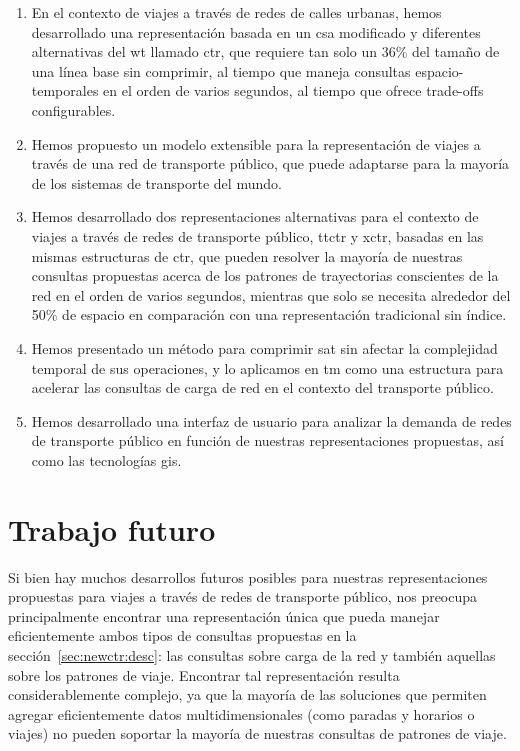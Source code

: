     \begin{enumerate}
        \item En el contexto de viajes a trav\'es de redes de calles urbanas, hemos desarrollado una representaci\'on basada en un \gls{csa} modificado y diferentes alternativas del \gls{wt} llamado \gls{ctr}, que requiere tan solo un 36\% del tama\~no de una l\'inea base sin comprimir, al tiempo que maneja consultas espacio-temporales en el orden de varios \micro segundos, al tiempo que ofrece trade-offs configurables.
        
        \item Hemos propuesto un modelo extensible para la representaci\'on de viajes a trav\'es de una red de transporte p\'ublico, que puede adaptarse para la mayor\'ia de los sistemas de transporte del mundo.
        
        \item Hemos desarrollado dos representaciones alternativas para el contexto de viajes a trav\'es de redes de transporte p\'ublico, \gls{ttctr} y \gls{xctr}, basadas en las mismas estructuras de \gls{ctr}, que pueden resolver la mayor\'ia de nuestras consultas propuestas acerca de los patrones de trayectorias conscientes de la red en el orden de varios \micro segundos, mientras que solo se necesita alrededor del 50\% de espacio en comparaci\'on con una representaci\'on tradicional sin \'indice.
        
        \item Hemos presentado un m\'etodo para comprimir \gls{sat} sin afectar la complejidad temporal de sus operaciones, y lo aplicamos en \gls{tm} como una estructura para acelerar las consultas de carga de red en el contexto del transporte p\'ublico.
        
        \item Hemos desarrollado una interfaz de usuario para analizar la demanda de redes de transporte p\'ublico en funci\'on de nuestras representaciones propuestas, as\'i como las tecnolog\'ias \gls{gis}.
    \end{enumerate}


\section{Trabajo futuro}
\label{sec:appendix-spanishsummary:trabajo-futuro}
    Si bien hay muchos desarrollos futuros posibles para nuestras representaciones propuestas para viajes a trav\'es de redes de transporte p\'ublico, nos preocupa principalmente encontrar una representaci\'on \'unica que pueda manejar eficientemente ambos tipos de consultas propuestas en la secci\'on~\ref{sec:newctr:desc}: las consultas sobre carga de la red y tambi\'en aquellas sobre los patrones de viaje. Encontrar tal representaci\'on resulta considerablemente complejo, ya que la mayor\'ia de las soluciones que permiten agregar eficientemente datos multidimensionales (como paradas y horarios o viajes) no pueden soportar la mayor\'ia de nuestras consultas de patrones de viaje.
    
